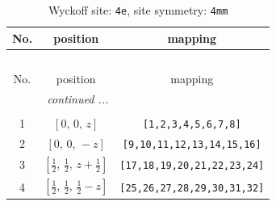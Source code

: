 \documentclass[fleqn,8pt]{jsarticle}
\begin{document}
\renewcommand{\arraystretch}{1.2}
\begin{longtable}{ccc}
\caption{Wyckoff site: {\tt 4e}, site symmetry: {\tt 4mm}}
 \\
 \hline \hline
No. & position & mapping \\ \hline \endfirsthead

\multicolumn{2}{l}{\tablename\ \thetable{}} \\
 \hline \hline
No. & position & mapping \\ \hline \endhead

 \hline \hline
\multicolumn{2}{r}{\footnotesize\it continued ...} \\ \endfoot

 \hline \hline
\multicolumn{2}{r}{} \\ \endlastfoot

1 & $\left[ 0,\, 0,\, z \right]$ & {\tt [1,2,3,4,5,6,7,8]} \\ \hline
2 & $\left[ 0,\, 0,\, - z \right]$ & {\tt [9,10,11,12,13,14,15,16]} \\ \hline
3 & $\left[ \frac{1}{2},\, \frac{1}{2},\, z + \frac{1}{2} \right]$ & {\tt [17,18,19,20,21,22,23,24]} \\ \hline
4 & $\left[ \frac{1}{2},\, \frac{1}{2},\, \frac{1}{2} - z \right]$ & {\tt [25,26,27,28,29,30,31,32]} \\
\end{longtable}
\renewcommand{\arraystretch}{1.2}
\end{document}
